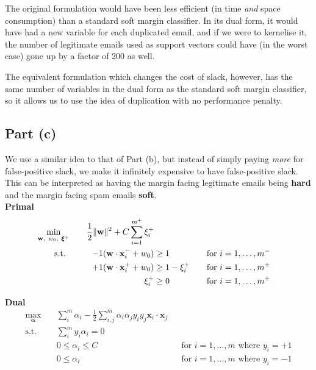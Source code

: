 The original formulation would have been less efficient (in time \textit{and} space consumption) than a standard soft margin classifier. In its dual form, it would have had a new variable for each duplicated email, and if we were to kernelise it, the number of legitimate emails used as support vectors could have (in the worst case) gone up by a factor of 200 as well.

The equivalent formulation which changes the cost of slack, however, has the same number of variables in the dual form as the standard soft margin classifier, so it allows us to use the idea of duplication with no performance penalty.

\subsection{Part (c)}
We use a similar idea to that of Part (b), but instead of simply paying \textit{more} for false-positive slack, we make it infinitely expensive to have false-positive slack. This can be interpreted as having the margin facing legitimate emails being \textbf{hard} and the margin facing spam emails \textbf{soft}.\\[1em]

\noindent\textbf{Primal}
\begin{alignat*}{3}
  \min_{\mathbf{w},~w_0,~\boldsymbol\xi^+}\quad&&\frac{1}{2}\lVert\mathbf{w}\rVert^2 + C\sum_{i=1}^{m^+}\xi_i^+\\
  \text{s.t. }\quad&&-1(\mathbf{w}\cdot\mathbf{x}_i^-+w_0) & \geq 1 &&\quad\text{for }i = 1,\ldots,m^-
  \\ &&+1(\mathbf{w}\cdot\mathbf{x}_i^++w_0) & \geq 1 - \xi_i^+ &&\quad\text{for }i = 1,\ldots,m^+
  \\ &&\xi_i^+ & \geq 0 &&\quad\text{for }i=1,\ldots,m^+
\end{alignat*}

\noindent\textbf{Dual}
\begin{align*}
  \max_{\boldsymbol\alpha}\quad&\sum_{i}^m\alpha_i-\frac{1}{2}\sum_{i,j}^{m}\alpha_i\alpha_jy_iy_j\mathbf{x}_i\cdot\mathbf{x}_j\\
  \text{s.t.}\quad&\sum_i^my_i\alpha_i = 0
  \\ & 0\leq\alpha_i\leq C && \text{for }i=1,\ldots,m\text{ where }y_i=+1
  \\ & 0\leq\alpha_i &&\text{for }i=1,\ldots,m\text{ where }y_i=-1
\end{align*}

